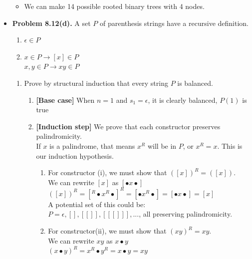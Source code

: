 \documentclass{article}
\begin{document}
\begin{itemize}
        \begin{itemize}[label=$\bullet$]
            \item We can make 14 possible rooted binary trees with 4 nodes.
        \end{itemize}
        \item \textbf{Problem 8.12(d).} A set $P$ of parenthesis strings have a recursive definition.
        \begin{enumerate}[label=\arabic*.]
            \item $\epsilon \in P$
            \item $x \in P \rightarrow [x] \in P$\\
            $x,y \in P \rightarrow xy \in P$
        \end{enumerate}
        \begin{enumerate}[label=(d)]
            \item Prove by structural induction that every string $P$ is balanced.
            \begin{enumerate}[label=\roman*.]
                \item \textbf{[Base case]} When $n=1$ and $s_1 = \epsilon$, it is clearly balanced, $P(1)$ is true
                \item \textbf{[Induction step]} We prove that each constructor preserves palindromicity.\\
                If $x$ is a palindrome, that means $x^R$ will be in $P$, or $x^R =x$. This is our induction hypothesis.
                \begin{enumerate}[label=\arabic*.]
                    \item For constructor (i), we must show that $([x])^R = ([x])$.\\
                    We can rewrite $[x]$ as $[\bullet x \bullet]$\\
                    $([x])^R = [^R \bullet x^R \bullet ]^R = [\bullet x^R \bullet ] = [\bullet x \bullet] = [x]$\\
                    A potential set of this could be:\\
                    $P = {\epsilon, [], [[]], [[[]]], ...}$, all preserving palindromicity.
                    \item For constructor(ii), we must show that $(xy)^R = xy$.\\
                    We can rewrite $xy$ as $x \bullet y$\\
                    $(x \bullet y)^R = x^R \bullet y^R = x \bullet y = xy$\\

\end{enumerate}
\end{enumerate}
\end{enumerate}
\end{itemize}
\end{document}
